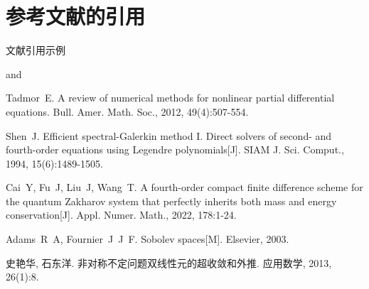 \documentclass{ctexart}
\begin{document}

\section{参考文献的引用}

文献引用示例 \cite{Tadmor2012,Shen1994,CaiFuLiuWang2022}

\cite{Adams2003,Tadmor2012} and \cite{Shen1994}

\cite{ShiShi2013}


\begin{thebibliography}{9} %
 Tadmor~E. A review of numerical methods for nonlinear partial differential
  equations\allowbreak[J]. Bull. Amer. Math. Soc., 2012, 49(4):507-554.

 Shen~J. Efficient spectral-Galerkin method I. Direct solvers of second- and fourth-order equations using Legendre polynomials[J]. SIAM J. Sci. Comput., 1994, 15(6):1489-1505.

 Cai~Y, Fu~J, Liu~J, Wang~T. A fourth-order compact finite difference scheme for the quantum Zakharov system that perfectly inherits both mass and energy conservation[J]. Appl. Numer. Math., 2022, 178:1-24.

 Adams~R~A, Fournier~J~J~F. Sobolev spaces[M]. Elsevier, 2003.

 史艳华, 石东洋. 非对称不定问题双线性元的超收敛和外推\allowbreak[J]. 应用数学, 2013, 26(1):8.
\end{thebibliography}
\end{document}
